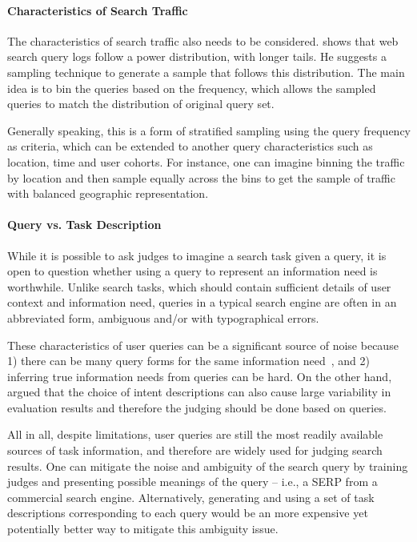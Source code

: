 \paragraph{Characteristics of Search Traffic} The characteristics of search traffic also needs to be considered. \cite{Baeza-Yates:2015} shows that web search query logs follow a power distribution, with longer tails. He suggests a sampling technique to generate a sample that follows this distribution. The main idea is to bin the queries based on the frequency, which allows the sampled queries to match the distribution of original query set. 

Generally speaking, this is a form of stratified sampling using the query frequency as criteria, which can be extended to another query characteristics such as location, time and user cohorts. For instance, one can imagine binning the traffic by location and then sample equally across the bins to get the sample of traffic with balanced geographic representation.


\paragraph{Query vs. Task Description} While it is possible to ask judges to imagine a search task given a query, it is open to question whether using a query to represent an information need is worthwhile. Unlike search tasks, which should contain sufficient details of user context and information need, queries in a typical search engine are often in an abbreviated form, ambiguous and/or with typographical errors. 

These characteristics of user queries can be a significant source of noise because 1) there can be many query forms for the same information need~\citep{Bailey:2015:UVI}, and 2) inferring true information needs from queries can be hard. On the other hand, \cite{Yilmaz:2014:EID} argued that the choice of intent descriptions can also cause large variability in evaluation results and therefore the judging should be done based on queries.

All in all, despite limitations, user queries are still the most readily available sources of task information, and therefore are widely used for judging search results. One can mitigate the noise and ambiguity of the search query by training judges and presenting possible meanings of the query -- i.e., a SERP from a commercial search engine. Alternatively, generating and using a set of task descriptions corresponding to each query would be an more expensive yet potentially better way to mitigate this ambiguity issue. %

